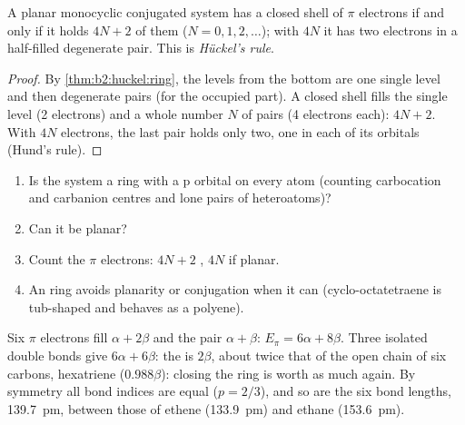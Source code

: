 \begin{theorem}\label{thm:b2:huckel:huckel-rule}
A planar monocyclic conjugated system has a closed shell of $\pi$ electrons if and only
if it holds $4N + 2$ of them ($N = 0, 1, 2, \dots$); with $4N$ it has two electrons in a
half-filled degenerate pair. This is \emph{Hückel's rule}.
\end{theorem}

\begin{proof}
By \cref{thm:b2:huckel:ring}, the levels from the bottom are one single level and
then degenerate pairs (for the occupied part). A closed shell fills the single
level (2 electrons) and a whole number $N$ of pairs (4 electrons each): $4N + 2$. With
$4N$ electrons, the last pair holds only two, one in each of its orbitals (Hund's
rule).
\end{proof}

\begin{method}[Is it aromatic?]\label{met:b2:huckel:aromaticity}
\begin{enumerate}
  \item Is the system a ring with a p orbital on every atom (counting carbocation
        and carbanion centres and lone pairs of heteroatoms)?
  \item Can it be planar?
  \item Count the $\pi$ electrons: $4N + 2$ , $4N$  if planar.
  \item An  ring avoids planarity or conjugation when it can
        (cyclo-octatetraene is tub-shaped and behaves as a polyene).
\end{enumerate}
\end{method}

\begin{example}[Benzene]\label{ex:b2:huckel:benzene}
Six $\pi$ electrons fill $\alpha + 2\beta$ and the pair $\alpha + \beta$: $E_\pi = 6\alpha + 8\beta$.
Three isolated double bonds give $6\alpha + 6\beta$: the  is $2\beta$,
about twice that of the open chain of six carbons, hexatriene ($0.988\beta$): closing
the ring is worth as much again. By symmetry all bond indices are equal ($p = 2/3$), and so are the six
bond lengths, \qty{139.7}{pm}, between those of ethene (\qty{133.9}{pm}) and ethane
(\qty{153.6}{pm}).
\end{example}

